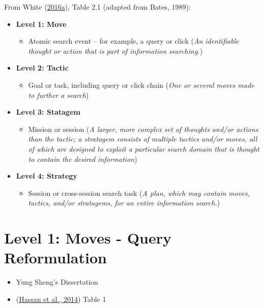 \documentclass[letterpaper, nobind]{templates/ociamthesis}
\providecommand{\tightlist}{%
  \setlength{\itemsep}{0pt}\setlength{\parskip}{0pt}}
\begin{document}
From White (\protect\hyperlink{ref-white2016interactions}{2016a}), Table 2.1 (adapted from Bates, 1989):

\begin{itemize}
\tightlist
\item
  \textbf{Level 1: Move}

  \begin{itemize}
  \tightlist
  \item
    Atomic search event -- for example, a query or click
    (\emph{An identifiable thought or action that is part of information searching.})
  \end{itemize}
\item
  \textbf{Level 2: Tactic}

  \begin{itemize}
  \tightlist
  \item
    Goal or task, including query or click chain
    (\emph{One or several moves made to further a search})
  \end{itemize}
\item
  \textbf{Level 3: Statagem}

  \begin{itemize}
  \tightlist
  \item
    Mission or session
    (\emph{A larger, more complex set of thoughts and/or actions than the tactic; a stratagem consists of multiple tactics and/or moves, all of which are designed to exploit a particular search domain that is thought to contain the desired information})
  \end{itemize}
\item
  \textbf{Level 4: Strategy}

  \begin{itemize}
  \tightlist
  \item
    Session or cross-session search task
    (\emph{A plan, which may contain moves, tactics, and/or stratagems, for an entire information search.})
  \end{itemize}
\end{itemize}

\hypertarget{level-1-moves---query-reformulation}{%
\section{Level 1: Moves - Query Reformulation}\label{level-1-moves---query-reformulation}}

\begin{itemize}
\tightlist
\item
  Yung Sheng's Dissertation
\item
  (\protect\hyperlink{ref-hassan2014struggling}{Hassan et al., 2014}) Table 1
\end{itemize}
\end{document}
